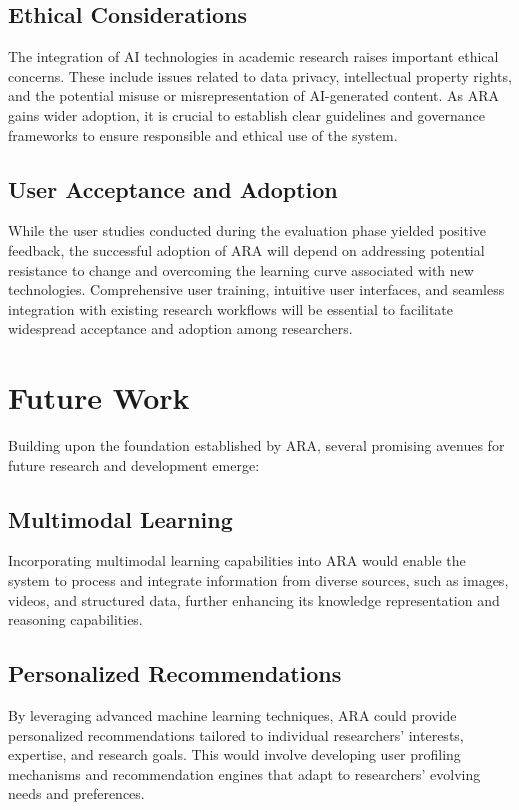 \documentclass[a4paper,conference]{IEEEtran}
\begin{document}
\subsection{Ethical Considerations}
The integration of AI technologies in academic research raises important ethical concerns. These include issues related to data privacy, intellectual property rights, and the potential misuse or misrepresentation of AI-generated content. As ARA gains wider adoption, it is crucial to establish clear guidelines and governance frameworks to ensure responsible and ethical use of the system.

\subsection{User Acceptance and Adoption}
While the user studies conducted during the evaluation phase yielded positive feedback, the successful adoption of ARA will depend on addressing potential resistance to change and overcoming the learning curve associated with new technologies. Comprehensive user training, intuitive user interfaces, and seamless integration with existing research workflows will be essential to facilitate widespread acceptance and adoption among researchers.

\section{Future Work}
Building upon the foundation established by ARA, several promising avenues for future research and development emerge:

\subsection{Multimodal Learning}
Incorporating multimodal learning capabilities into ARA would enable the system to process and integrate information from diverse sources, such as images, videos, and structured data, further enhancing its knowledge representation and reasoning capabilities.

\subsection{Personalized Recommendations}
By leveraging advanced machine learning techniques, ARA could provide personalized recommendations tailored to individual researchers' interests, expertise, and research goals. This would involve developing user profiling mechanisms and recommendation engines that adapt to researchers' evolving needs and preferences.
\end{document}
